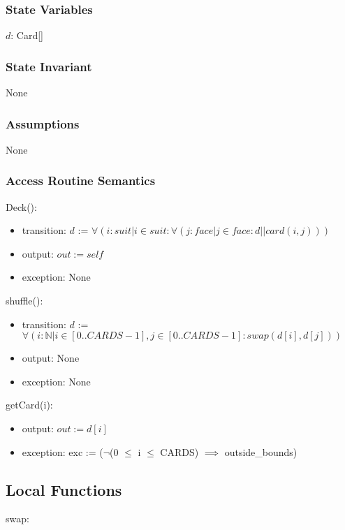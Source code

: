 \documentclass[12pt]{article}
\begin{document}
\subsubsection* {State Variables}

$d$: Card[]\\


\subsubsection* {State Invariant}

None

\subsubsection* {Assumptions}

None

\subsubsection* {Access Routine Semantics}

Deck():
\begin{itemize}
	\item transition: $d$ := $\forall( i : suit|i \in suit : \forall(j : face|j \in face : d || card(i,j)))$ 
	\item output: $out := \mathit{self}$
	\item exception: None
\end{itemize}

\noindent shuffle():
\begin{itemize}
	\item transition: $d$ := $\forall(i : \mathbb{N}| i \in [0..CARDS-1], j \in [0..CARDS-1] : swap(d[i],d[j]))$
	\item output: None
	\item exception: None
\end{itemize}

\noindent getCard(i):
\begin{itemize}
	\item output: $out := d[i]$
	\item exception: exc := ($\lnot$(0 $\le$ i $\le$ CARDS) $\implies$ outside\_bounds)
\end{itemize}

\subsection* {Local Functions}
swap: 
\end{document}
